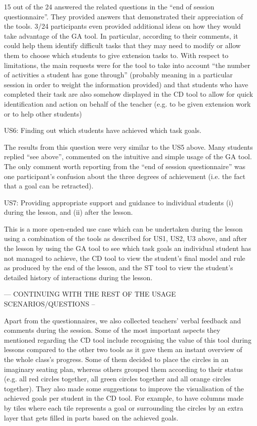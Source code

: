 15 out of the 24 answered the related questions in the “end of session
questionnaire”. They  provided answers that demonstrated their
appreciation of the tools. 3/24 participants even provided additional
ideas on how they would take advantage of the GA tool. In particular,
according to their comments, it could help them identify difficult
tasks that they may need to modify or allow them to choose which
students to give extension tasks to. With respect to limitations, the
main requests were for the tool to  take into account “the number of
activities a student has gone through” (probably meaning in a
particular session in order to weight the information provided) and
that students who have completed their task are also somehow displayed
in the CD tool to allow for quick identification and action on behalf
of the teacher (e.g. to be given extension work or to help other
students) 

US6: Finding out which students have achieved which task goals.

The results from this question were very similar to the US5
above. Many students replied “see above”, commented on the intuitive
and simple usage of the GA tool. The only comment worth reporting from
the “end of session questionnaire” was one participant’s confusion
about the three degrees of achievement (i.e. the fact that a goal can
be retracted).  

US7: Providing appropriate support and guidance to individual students
(i) during the lesson, and (ii) after the lesson. 

This is a more open-ended use case which can be undertaken during the
lesson using a combination of the tools as described for US1, US2, U3
above, and after the lesson by using the GA tool to see which task
goals an individual student has not managed to achieve, the CD tool to
view the student’s final model and rule as produced by the end of the
lesson, and the ST tool to view the student’s detailed history of
interactions during the lesson. 


--- CONTINUING WITH THE REST OF THE USAGE SCENARIOS/QUESTIONS  --

Apart from the questionnaires, we also collected teachers’ verbal
feedback and comments during the session. Some of the most important
aspects they mentioned regarding the CD tool include recognising the
value of this tool during lessons compared to the other two tools as
it gave them an instant overview of the whole class’s progress. Some
of them decided to place the circles in an imaginary seating plan,
whereas others grouped them according to their status (e.g. all red
circles together, all green circles together and all orange circles
together). They also made some suggestions to improve the
visualisation of the achieved goals per student in the CD tool. For
example, to have columns made by tiles where each tile represents a
goal or surrounding the circles by an extra layer that gets filled in
parts based on the achieved goals.

